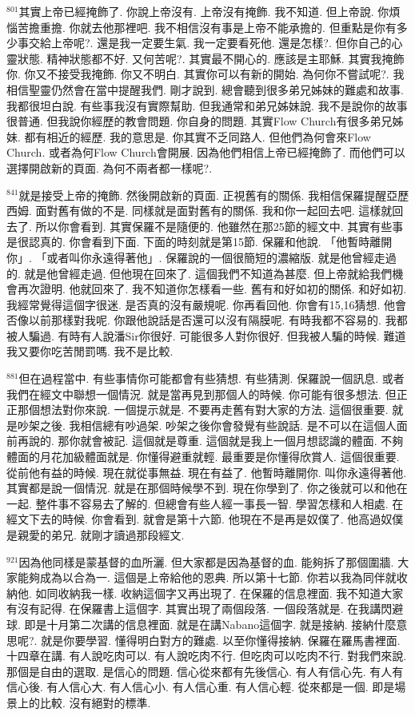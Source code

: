 \documentclass{book}
\begin{document}
$^{801}$其實上帝已經掩飾了.
你說上帝沒有.
上帝沒有掩飾.
我不知道.
但上帝說.
你煩惱苦擔重擔.
你就去他那裡吧.
我不相信沒有事是上帝不能承擔的.
但重點是你有多少事交給上帝呢?.
還是我一定要生氣.
我一定要看死他.
還是怎樣?.
但你自己的心靈狀態.
精神狀態都不好.
又何苦呢?.
其實最不開心的.
應該是主耶穌.
其實我掩飾你.
你又不接受我掩飾.
你又不明白.
其實你可以有新的開始.
為何你不嘗試呢?.
我相信聖靈仍然會在當中提醒我們.
剛才說到.
總會聽到很多弟兄姊妹的難處和故事.
我都很坦白說.
有些事我沒有實際幫助.
但我通常和弟兄姊妹說.
我不是說你的故事很普通.
但我說你經歷的教會問題.
你自身的問題.
其實Flow Church有很多弟兄姊妹.
都有相近的經歷.
我的意思是.
你其實不乏同路人.
但他們為何會來Flow Church.
或者為何Flow Church會開展.
因為他們相信上帝已經掩飾了.
而他們可以選擇開啟新的頁面.
為何不兩者都一樣呢?.

$^{841}$就是接受上帝的掩飾.
然後開啟新的頁面.
正視舊有的關係.
我相信保羅提醒亞歷西姆.
面對舊有做的不是.
同樣就是面對舊有的關係.
我和你一起回去吧.
這樣就回去了.
所以你會看到.
其實保羅不是隨便的.
他雖然在那25節的經文中.
其實有些事是很認真的.
你會看到下面.
下面的時刻就是第15節.
保羅和他說.
「他暫時離開你」.
「或者叫你永遠得著他」.
保羅說的一個很簡短的濃縮版.
就是他曾經走過的.
就是他曾經走過.
但他現在回來了.
這個我們不知道為甚麼.
但上帝就給我們機會再次證明.
他就回來了.
我不知道你怎樣看一些.
舊有和好如初的關係.
和好如初.
我經常覺得這個字很迷.
是否真的沒有嚴規呢.
你再看回他.
你會有15,16猜想.
他會否像以前那樣對我呢.
你跟他說話是否還可以沒有隔膜呢.
有時我都不容易的.
我都被人騙過.
有時有人說潘Sir你很好.
可能很多人對你很好.
但我被人騙的時候.
難道我又要你吃苦閒罰嗎.
我不是比較.

$^{881}$但在過程當中.
有些事情你可能都會有些猜想.
有些猜測.
保羅說一個訊息.
或者我們在經文中聯想一個情況.
就是當再見到那個人的時候.
你可能有很多想法.
但正正那個想法對你來說.
一個提示就是.
不要再走舊有對大家的方法.
這個很重要.
就是吵架之後.
我相信總有吵過架.
吵架之後你會發覺有些說話.
是不可以在這個人面前再說的.
那你就會被記.
這個就是尊重.
這個就是我上一個月想認識的體面.
不夠體面的月花加級體面就是.
你懂得避重就輕.
最重要是你懂得欣賞人.
這個很重要.
從前他有益的時候.
現在就從事無益.
現在有益了.
他暫時離開你.
叫你永遠得著他.
其實都是說一個情況.
就是在那個時候學不到.
現在你學到了.
你之後就可以和他在一起.
整件事不容易去了解的.
但總會有些人經一事長一智.
學習怎樣和人相處.
在經文下去的時候.
你會看到.
就會是第十六節.
他現在不是再是奴僕了.
他高過奴僕是親愛的弟兄.
就剛才讀過那段經文.

$^{921}$因為他同樣是蒙基督的血所灑.
但大家都是因為基督的血.
能夠拆了那個圍牆.
大家能夠成為以合為一.
這個是上帝給他的恩典.
所以第十七節.
你若以我為同伴就收納他.
如同收納我一樣.
收納這個字又再出現了.
在保羅的信息裡面.
我不知道大家有沒有記得.
在保羅書上這個字.
其實出現了兩個段落.
一個段落就是.
在我講閃避球.
即是十月第二次講的信息裡面.
就是在講Nabano這個字.
就是接納.
接納什麼意思呢?.
就是你要學習.
懂得明白對方的難處.
以至你懂得接納.
保羅在羅馬書裡面.
十四章在講.
有人說吃肉可以.
有人說吃肉不行.
但吃肉可以吃肉不行.
對我們來說.
那個是自由的選取.
是信心的問題.
信心從來都有先後信心.
有人有信心先.
有人有信心後.
有人信心大.
有人信心小.
有人信心重.
有人信心輕.
從來都是一個.
即是場景上的比較.
沒有絕對的標準.
\end{document}
